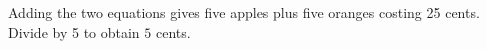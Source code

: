 Adding the two equations gives five apples plus five oranges costing 25 cents. Divide by 5 to obtain $\boxed5$ cents.
